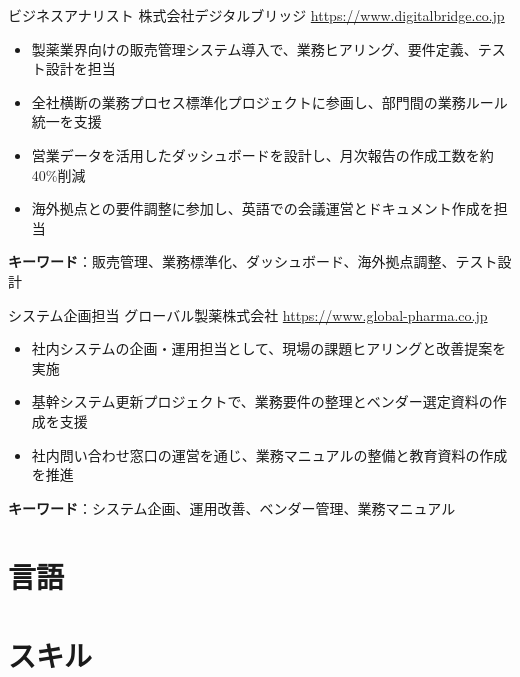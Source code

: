 \documentclass[a4paper, serif, 10pt]{moderncv}
\begin{document}
        {ビジネスアナリスト}
        {株式会社デジタルブリッジ}
        {\url{https://www.digitalbridge.co.jp}}
        {}
        {\begin{itemize}
\item 製薬業界向けの販売管理システム導入で、業務ヒアリング、要件定義、テスト設計を担当
\item 全社横断の業務プロセス標準化プロジェクトに参画し、部門間の業務ルール統一を支援
\item 営業データを活用したダッシュボードを設計し、月次報告の作成工数を約40\%削減
\item 海外拠点との要件調整に参加し、英語での会議運営とドキュメント作成を担当
\end{itemize}
\textbf{キーワード}：販売管理、業務標準化、ダッシュボード、海外拠点調整、テスト設計}

        {システム企画担当}
        {グローバル製薬株式会社}
        {\url{https://www.global-pharma.co.jp}}
        {}
        {\begin{itemize}
\item 社内システムの企画・運用担当として、現場の課題ヒアリングと改善提案を実施
\item 基幹システム更新プロジェクトで、業務要件の整理とベンダー選定資料の作成を支援
\item 社内問い合わせ窓口の運営を通じ、業務マニュアルの整備と教育資料の作成を推進
\end{itemize}
\textbf{キーワード}：システム企画、運用改善、ベンダー管理、業務マニュアル}
\section{言語}

\section{スキル}

\end{document}
